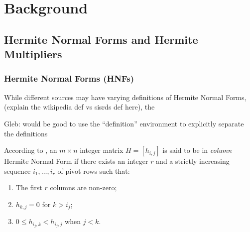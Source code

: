 \documentclass[oneside, a4paper, onecolumn, 11pt]{article}
\begin{document}

\section{Background}

\subsection{Hermite Normal Forms and Hermite Multipliers}

\subsubsection{Hermite Normal Forms (HNFs)}

While different sources may have varying definitions of Hermite Normal Forms, (explain the wikipedia def vs sisrds def here), the

    {\color{purple}Gleb: would be good to use the ``definition'' environment to explicitly separate the definitions}

According to \cite[SISRDS]{Hubert2013}, an \(m \times n\) integer matrix \(H = [h_{i, j}]\) is said to be in \textit{column} Hermite Normal Form if there exists an integer \(r\) and a strictly increasing sequence \(i_1, \dots, i_r\) of pivot rows such that:
\begin{enumerate}[label=(\roman*)]
    \item The first \(r\) columns are non-zero;
    \item \(h_{k, j} = 0\) for \(k > i_j\);
    \item \(0 \le h_{i_j, k} < h_{i_j, j}\) when \(j < k\).
\end{enumerate}
\end{document}
